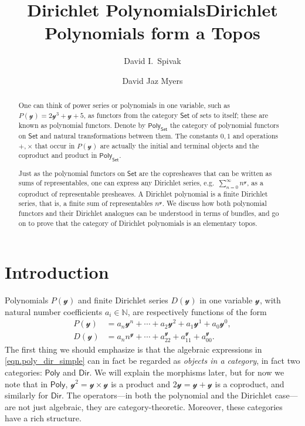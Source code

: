 \documentclass[11pt, article, one side]{memoir}
\theoremstyle{theorem}
\theoremstyle{definition}
\theoremstyle{remark}
\newcommand{\cat}[1]{\mathcal{#1}}%
\newcommand{\Cat}[1]{\mathsf{#1}}%
\newcommand{\nn}{\mathbb{N}}
\newcommand{\smset}{\Cat{Set}}
\newcommand{\yon}{\mathcal{y}}
\newcommand{\poly}{\Cat{Poly}}
\newcommand{\dir}{\Cat{Dir}}
\begin{document}
\title{Dirichlet Polynomials}
\title{Dirichlet Polynomials form a Topos}

\author{David I.\ Spivak%
\and David Jaz Myers%
}

\maketitle
\begin{abstract}
One can think of power series or polynomials in one variable, such as $P(\yon)=2\yon^3+\yon+5$, as functors from the category $\smset$ of sets to itself; these are known as polynomial functors. Denote by $\poly_\smset$ the category of polynomial functors on $\smset$ and natural transformations between them. The constants $0,1$ and operations $+,\times$ that occur in $P(\yon)$ are actually the initial and terminal objects and the coproduct and product in $\poly_\smset$. 

Just as the polynomial functors on $\smset$ are the copresheaves that can be written as sums of representables, one can express any Dirichlet series, e.g.\ $\sum_{n=0}^\infty n^\yon$, as a coproduct of representable presheaves. A Dirichlet polynomial is a finite Dirichlet series, that is, a finite sum of representables $n^{\yon}$. We discuss how both polynomial functors and their Dirichlet analogues can be understood in terms of bundles, and go on to prove that the category of Dirichlet polynomials is an elementary topos.

\end{abstract}

\chapter{Introduction}\label{chap.intro}

Polynomials $P(\yon)$ and finite Dirichlet series $D(\yon)$ in one variable $\cat{y}$, with natural number coefficients $a_i\in\nn$, are respectively functions of the form
\begin{equation}\label{eqn.poly_dir_simple}
\begin{aligned}
  P(\yon)&=a_n\yon^n+\cdots+a_2\yon^2+a_1\yon^1+a_0\yon^0,\\
  D(\yon)&=a_n n^\yon+\cdots+a_22^\yon+a_11^\yon+a_00^\yon.
\end{aligned}
\end{equation}
The first thing we should emphasize is that the algebraic expressions in \eqref{eqn.poly_dir_simple} can in fact be regarded as \emph{objects in a category}, in fact two categories: $\poly$ and $\dir$. We will explain the morphisms later, but for now we note that in $\poly$, $\yon^2=\yon\times\yon$ is a product and $2\yon=\yon+\yon$ is a coproduct, and similarly for $\dir$. The operators---in both the polynomial and the Dirichlet case---are not just algebraic, they are category-theoretic. Moreover, these categories have a rich structure. 
\end{document}
